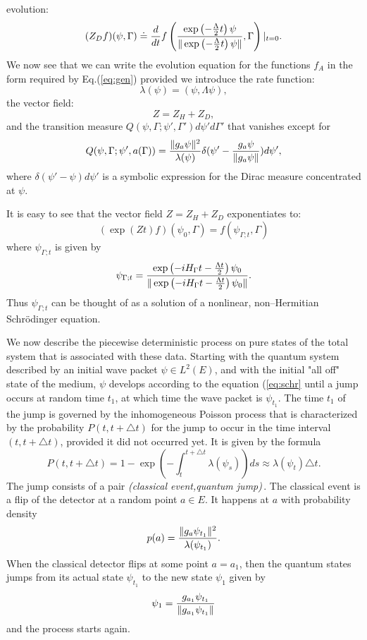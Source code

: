 \documentclass[12pt]{article}
\def\be{\begin{equation}}
\def\ee{\end{equation}}
\begin{document}
evolution: \be (Z_D f) (\psi,\Gamma)\doteq {d\over dt}f\left({\exp\left(
-{\Lambda\over 2}t \right)\psi\over \Vert \exp\left( -{\Lambda\over
2}t\right)\psi\Vert},\Gamma\right)\vert_{t=0}. \ee We now see that we can
write the evolution equation for the functions $f_A$ in the form required
by Eq.(\ref{eq:gen}) provided we introduce the rate function: \be
\lambda(\psi)=(\psi,\Lambda\psi), \label{eq:lam2}\ee the vector field: \be
Z=Z_H+Z_D ,\ee and the transition measure
$Q(\psi,\Gamma;\psi',\Gamma')d\psi'd\Gamma'$ that vanishes except for \be
Q(\psi,\Gamma;\psi',a(\Gamma))={\Vert g_a \psi \Vert^2\over
{\lambda(\psi)}} \delta (\psi'- {g_a\psi\over{\Vert g_a\psi\Vert}})d\psi',
\ee where $\delta(\psi'-\psi)d\psi'$ is a symbolic expression for the Dirac
measure concentrated at $\psi$.

It is easy to see that the vector field
$Z=Z_H+Z_D$ exponentiates to: \be \left(\exp
(Zt)f\right)(\psi_0,\Gamma)=f\left(\psi_{\Gamma;t},\Gamma\right) \ee where
$\psi_{\Gamma;t}$ is given by \be \psi_{\Gamma;t}={\exp\left(-iH_\Gamma
t-{{\Lambda t}\over 2}\right)\psi_0 \over{\Vert \exp\left(-iH_\Gamma
t-{{\Lambda t}\over 2}\right)\psi_0\Vert}}.\label{eq:schr}\ee
Thus $\psi_{\Gamma;t}$ can be thought of as a solution of a nonlinear,
non--Hermitian Schr\"odinger equation.

We now describe the piecewise deterministic process on pure states of the
total system that is associated with these data. Starting with the quantum
system described by an initial wave packet $\psi\in L^2(E)$, and with the
initial "all off" state of the medium, $\psi$ develops according to the
equation (\ref{eq:schr} until a jump occurs at random time $t_1$, at which
time the wave packet is $\psi_{t_1}$. The time $t_1$ of the jump is
governed by the inhomogeneous Poisson process that is characterized by the
probability $P(t,t+\triangle t)$ for the jump to occur in the time interval
$(t,t+\triangle t)$, provided it did not occurred yet. It is given by the
formula
\be
P(t,t+\triangle t)=1-\exp \left(-\int_t^{t+\triangle t}
\lambda(\psi_s)\right)ds\approx \lambda(\psi_t)\triangle t .
\label{eq:rt}
\ee
The jump consists of a pair {\sl (classical event,quantum jump)}\,. The
classical event is a flip of the detector at a random point $a\in E$. It
happens at $a$ with probability density
\be
p(a)={\Vert g_a \psi_{t_1}\Vert^2\over\lambda(\psi_{t_1})}.
\label{eq:pa}
\ee
 When the classical detector flips at some point $a=a_1$, then the quantum
states jumps from its actual state $\psi_{t_1}$ to the new state $\psi_1$
given by
\be
\psi_1={g_{a_1}\psi_{t_1}\over{\Vert g_{a_1}\psi_{t_1}\Vert}}
\ee
and the process starts again.
\end{document}

